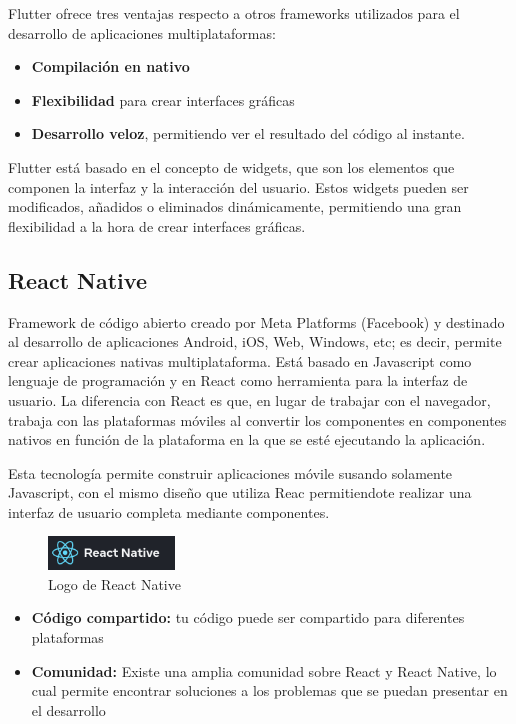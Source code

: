 Flutter ofrece tres ventajas respecto a otros frameworks utilizados para el desarrollo de aplicaciones multiplataformas:

\begin{itemize}
\item \textbf{Compilación en nativo}
\item \textbf{Flexibilidad} para crear interfaces gráficas
\item \textbf{Desarrollo veloz}, permitiendo ver el resultado del código al instante.

\end{itemize}
Flutter está basado en el concepto de widgets, que son los elementos que componen la interfaz y la interacción del usuario. Estos widgets pueden ser modificados, añadidos o eliminados
dinámicamente, permitiendo una gran flexibilidad a la hora de crear interfaces gráficas. 

\subsection{React Native}
Framework de código abierto creado por Meta Platforms (Facebook) y destinado al desarrollo de aplicaciones Android, iOS, Web, Windows, etc; es decir, permite
crear aplicaciones nativas multiplataforma.
Está basado en Javascript como lenguaje de programación y en React como herramienta para la interfaz de usuario. La diferencia con React es que, en lugar de 
trabajar con el navegador, trabaja con las plataformas móviles al convertir los componentes en componentes nativos en función de la plataforma en la que se esté
ejecutando la aplicación. 

Esta tecnología permite construir aplicaciones móvile susando solamente Javascript, con el mismo diseño que utiliza
Reac permitiendote realizar una interfaz de usuario completa mediante componentes. 
\begin{figure}[H]
\centering
\includegraphics[width=0.3\textwidth]{imagenes/c2/reactnative.png}
\caption{Logo de React Native}
\end{figure}
\begin{itemize}
\item \textbf{Código compartido:} tu código puede ser compartido para diferentes plataformas
\item \textbf{Comunidad:} Existe una amplia comunidad sobre React y React Native, lo cual permite encontrar soluciones a los problemas que se puedan presentar en el desarrollo
\end {itemize}

